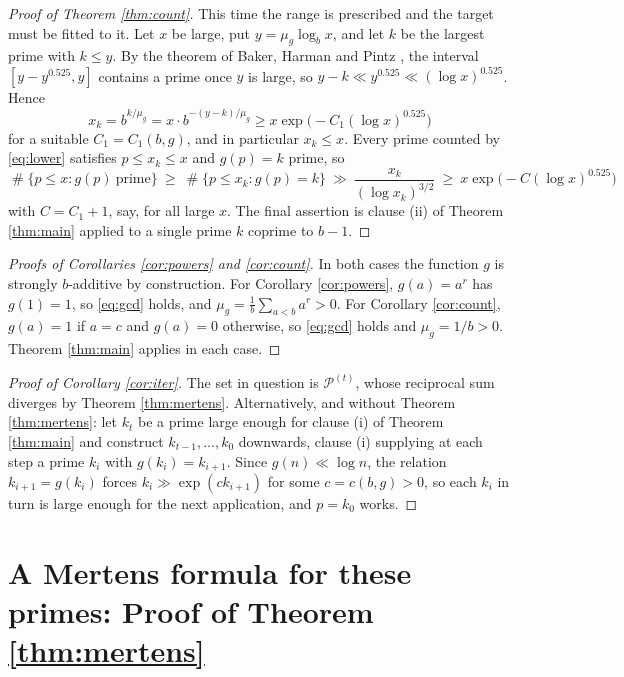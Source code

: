 \documentclass[11pt,reqno]{amsart}
\theoremstyle{plain}
\theoremstyle{definition}
\DeclareMathOperator{\Card}{\#}
\begin{document}
\begin{proof}[Proof of Theorem \ref{thm:count}]
This time the range is prescribed and the target must be fitted to it. Let $x$ be large, put $y=\mu_g\log_b x$, and let $k$ be the largest prime with $k\le y$. By the theorem of Baker, Harman and Pintz \cite{bhp}, the interval $[y-y^{0.525},y]$ contains a prime once $y$ is large, so $y-k\ll y^{0.525}\ll(\log x)^{0.525}$. Hence
\[
x_k=b^{k/\mu_g}=x\cdot b^{-(y-k)/\mu_g}\ge x\exp\big(-C_1(\log x)^{0.525}\big)
\]
for a suitable $C_1=C_1(b,g)$, and in particular $x_k\le x$. Every prime counted by \eqref{eq:lower} satisfies $p\le x_k\le x$ and $g(p)=k$ prime, so
\[
\Card\{p\le x: g(p)\ \text{prime}\}\ \ge\ \Card\{p\le x_k: g(p)=k\}\ \gg\ \frac{x_k}{(\log x_k)^{3/2}}\ \ge\ x\exp\big(-C(\log x)^{0.525}\big)
\]
with $C=C_1+1$, say, for all large $x$. The final assertion is clause (ii) of Theorem \ref{thm:main} applied to a single prime $k$ coprime to $b-1$.
\end{proof}

\begin{proof}[Proofs of Corollaries \ref{cor:powers} and \ref{cor:count}]
In both cases the function $g$ is strongly $b$-additive by construction. For Corollary \ref{cor:powers}, $g(a)=a^r$ has $g(1)=1$, so \eqref{eq:gcd} holds, and $\mu_g=\frac1b\sum_{a<b}a^r>0$. For Corollary \ref{cor:count}, $g(a)=1$ if $a=c$ and $g(a)=0$ otherwise, so \eqref{eq:gcd} holds and $\mu_g=1/b>0$. Theorem \ref{thm:main} applies in each case.
\end{proof}

\begin{proof}[Proof of Corollary \ref{cor:iter}]
The set in question is $\mathcal P^{(t)}$, whose reciprocal sum diverges by Theorem \ref{thm:mertens}. Alternatively, and without Theorem \ref{thm:mertens}: let $k_t$ be a prime large enough for clause (i) of Theorem \ref{thm:main} and construct $k_{t-1},\dots,k_0$ downwards, clause (i) supplying at each step a prime $k_i$ with $g(k_i)=k_{i+1}$. Since $g(n)\ll\log n$, the relation $k_{i+1}=g(k_i)$ forces $k_i\gg\exp(ck_{i+1})$ for some $c=c(b,g)>0$, so each $k_i$ in turn is large enough for the next application, and $p=k_0$ works.
\end{proof}

\section{A Mertens formula for these primes: Proof of Theorem \ref{thm:mertens}}
\end{document}
